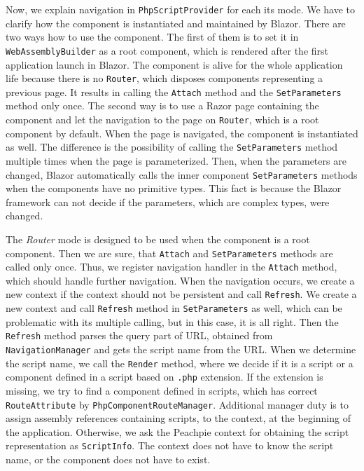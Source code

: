 Now, we explain navigation in \texttt{PhpScriptProvider} for each its mode.
We have to clarify how the component is instantiated and maintained by Blazor.
There are two ways how to use the component.
The first of them is to set it in \texttt{WebAssemblyBuilder} as a root component,
which is rendered after the first application launch in Blazor.
The component is alive for the whole application life because there is no \texttt{Router}, which disposes components representing a previous page. 
It results in calling the \texttt{Attach} method and the \texttt{SetParameters} method only once.
The second way is to use a Razor page containing the component and let the navigation to the page on \texttt{Router}, which is a root component by default.
When the page is navigated, the component is instantiated as well.
The difference is the possibility of calling the \texttt{SetParameters} method multiple times when the page is parameterized.
Then, when the parameters are changed, Blazor automatically calls the inner component \texttt{SetParameters} methods when the components have no primitive types. 
This fact is because the Blazor framework can not decide if the parameters, which are complex types, were changed.
\par
The \textit{Router} mode is designed to be used when the component is a root component.
Then we are sure, that \texttt{Attach} and \texttt{SetParameters} methods are called only once.
Thus, we register navigation handler in the \texttt{Attach} method, which should handle further navigation.
When the navigation occurs, we create a new context if the context should not be persistent and call \texttt{Refresh}.
We create a new context and call \texttt{Refresh} method in \texttt{SetParameters} as well, which can be problematic with its multiple calling, but in this case, it is all right.
Then the \texttt{Refresh} method parses the query part of URL, obtained from \texttt{NavigationManager} and gets the script name from the URL.
When we determine the script name, we call the \texttt{Render} method, where we decide if it is a script or a component defined in a script based on \texttt{.php} extension.
If the extension is missing, we try to find a component defined in scripts, which has correct \texttt{RouteAttribute} by \texttt{PhpComponentRouteManager}.
Additional manager duty is to assign assembly references containing scripts, to the context, at the beginning of the application.
Otherwise, we ask the Peachpie context for obtaining the script representation as \texttt{ScriptInfo}.
The context does not have to know the script name, or the component does not have to exist. 
